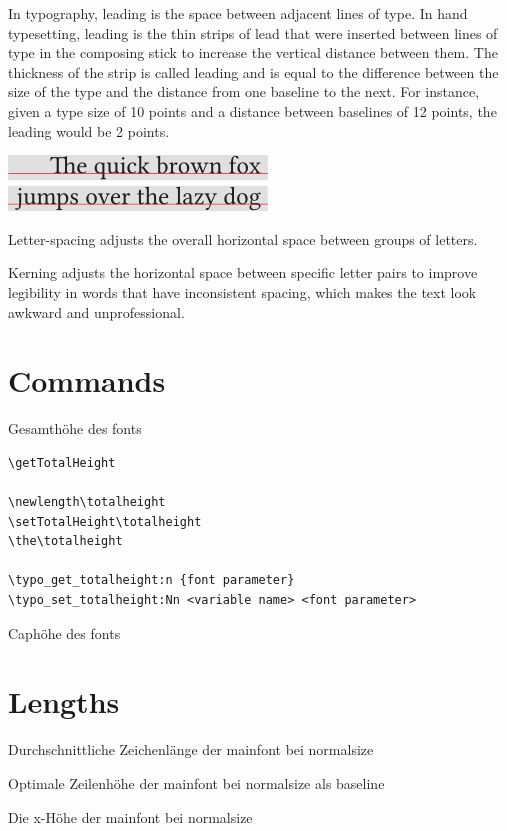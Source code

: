 \documentclass[a4paper,10pt]{scrarticle}
\begin{document}
\noindent{} In typography, leading is the space between adjacent lines of type. 
In hand typesetting, leading is the thin strips of lead that were inserted between lines of type in the composing stick to increase the vertical distance between them. 
The thickness of the strip is called leading and is equal to the difference between the size of the type and the distance from one baseline to the next. For instance, given a type size of 10 points and a distance between baselines of 12 points, the leading would be 2 points.\par
\medskip
{\centering \includegraphics[scale=1]{img/Typography leading font.png} \par}
\medskip

\noindent{}

\noindent{}

\noindent{}

\noindent{} Letter-spacing adjusts the overall horizontal space between groups of letters.
 
\noindent{} Kerning adjusts the horizontal space between specific letter pairs to improve legibility in words that have inconsistent spacing, which makes the text look awkward and unprofessional.

\section{Commands}

\noindent{} Gesamthöhe des fonts
\begin{lstlisting}[language={[AlLaTeX]TeX}]
\getTotalHeight

\newlength\totalheight
\setTotalHeight\totalheight
\the\totalheight

\typo_get_totalheight:n {font parameter}
\typo_set_totalheight:Nn <variable name> <font parameter>
\end{lstlisting}

\noindent{} Caphöhe des fonts

\section{Lengths}

\noindent{} Durchschnittliche Zeichenlänge der mainfont bei normalsize

\noindent{} Optimale Zeilenhöhe der mainfont bei normalsize als baseline

\noindent{} Die x-Höhe der mainfont bei normalsize 
\end{document}
